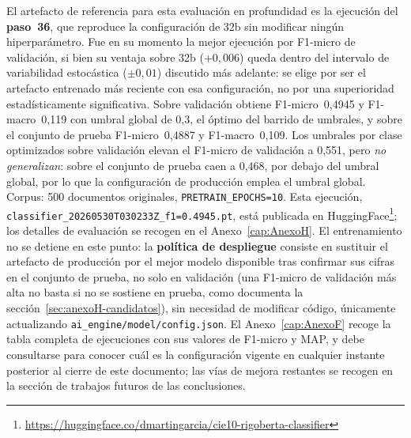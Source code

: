 El artefacto de referencia para esta evaluación en profundidad es la ejecución del \textbf{paso~36}, que reproduce la configuración de 32b sin modificar ningún hiperparámetro. Fue en su momento la mejor ejecución por F1-micro de validación, si bien su ventaja sobre 32b ($+0{,}006$) queda dentro del intervalo de variabilidad estocástica ($\pm 0{,}01$) discutido más adelante: se elige por ser el artefacto entrenado más reciente con esa configuración, no por una superioridad estadísticamente significativa. Sobre validación obtiene F1-micro~0,4945 y F1-macro~0,119 con umbral global de 0,3, el óptimo del barrido de umbrales, y sobre el conjunto de prueba F1-micro~0,4887 y F1-macro~0,109. Los umbrales por clase optimizados sobre validación elevan el F1-micro de validación a 0,551, pero \emph{no generalizan}: sobre el conjunto de prueba caen a 0,468, por debajo del umbral global, por lo que la configuración de producción emplea el umbral global. Corpus: 500 documentos originales, \texttt{PRETRAIN\_EPOCHS=10}. Esta ejecución, \texttt{classifier\_20260530T030233Z\_f1=0.4945.pt}, está publicada en HuggingFace\footnote{\url{https://huggingface.co/dmartingarcia/cie10-rigoberta-classifier}}; los detalles de evaluación se recogen en el Anexo~\ref{cap:AnexoH}. El entrenamiento no se detiene en este punto: la \textbf{política de despliegue} consiste en sustituir el artefacto de producción por el mejor modelo disponible tras confirmar sus cifras en el conjunto de prueba, no solo en validación (una F1-micro de validación más alta no basta si no se sostiene en prueba, como documenta la sección~\ref{sec:anexoH-candidatos}), sin necesidad de modificar código, únicamente actualizando \texttt{ai\_engine/model/config.json}. El Anexo~\ref{cap:AnexoF} recoge la tabla completa de ejecuciones con sus valores de F1-micro y MAP, y debe consultarse para conocer cuál es la configuración vigente en cualquier instante posterior al cierre de este documento; las vías de mejora restantes se recogen en la sección de trabajos futuros de las conclusiones.

